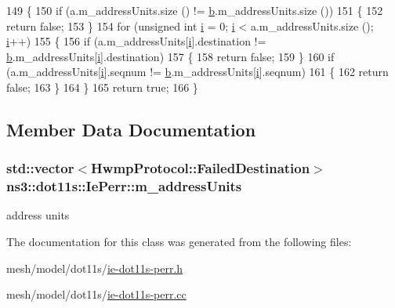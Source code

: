 \begin{DoxyCode}
149 \{
150   \textcolor{keywordflow}{if} (a.m\_addressUnits.size () != \hyperlink{buildings__pathloss_8m_a21ad0bd836b90d08f4cf640b4c298e7c}{b}.m\_addressUnits.size ())
151     \{
152       \textcolor{keywordflow}{return} \textcolor{keyword}{false};
153     \}
154   \textcolor{keywordflow}{for} (\textcolor{keywordtype}{unsigned} \textcolor{keywordtype}{int} \hyperlink{bernuolliDistribution_8m_a6f6ccfcf58b31cb6412107d9d5281426}{i} = 0; \hyperlink{bernuolliDistribution_8m_a6f6ccfcf58b31cb6412107d9d5281426}{i} < a.m\_addressUnits.size (); \hyperlink{bernuolliDistribution_8m_a6f6ccfcf58b31cb6412107d9d5281426}{i}++)
155     \{
156       \textcolor{keywordflow}{if} (a.m\_addressUnits[\hyperlink{bernuolliDistribution_8m_a6f6ccfcf58b31cb6412107d9d5281426}{i}].destination != \hyperlink{buildings__pathloss_8m_a21ad0bd836b90d08f4cf640b4c298e7c}{b}.m\_addressUnits[\hyperlink{bernuolliDistribution_8m_a6f6ccfcf58b31cb6412107d9d5281426}{i}].destination)
157         \{
158           \textcolor{keywordflow}{return} \textcolor{keyword}{false};
159         \}
160       \textcolor{keywordflow}{if} (a.m\_addressUnits[\hyperlink{bernuolliDistribution_8m_a6f6ccfcf58b31cb6412107d9d5281426}{i}].seqnum != \hyperlink{buildings__pathloss_8m_a21ad0bd836b90d08f4cf640b4c298e7c}{b}.m\_addressUnits[\hyperlink{bernuolliDistribution_8m_a6f6ccfcf58b31cb6412107d9d5281426}{i}].seqnum)
161         \{
162           \textcolor{keywordflow}{return} \textcolor{keyword}{false};
163         \}
164     \}
165   \textcolor{keywordflow}{return} \textcolor{keyword}{true};
166 \}
\end{DoxyCode}


\subsection{Member Data Documentation}
\subsubsection[{\texorpdfstring{m\+\_\+address\+Units}{m_addressUnits}}]{\setlength{\rightskip}{0pt plus 5cm}std\+::vector$<${\bf Hwmp\+Protocol\+::\+Failed\+Destination}$>$ ns3\+::dot11s\+::\+Ie\+Perr\+::m\+\_\+address\+Units\hspace{0.3cm}{\ttfamily [private]}}\hypertarget{classns3_1_1dot11s_1_1IePerr_af636b95a9bb755de97ef4daae053c409}{}\label{classns3_1_1dot11s_1_1IePerr_af636b95a9bb755de97ef4daae053c409}


address units 



The documentation for this class was generated from the following files\+:\begin{DoxyCompactItemize}
\item 
mesh/model/dot11s/\hyperlink{ie-dot11s-perr_8h}{ie-\/dot11s-\/perr.\+h}\item 
mesh/model/dot11s/\hyperlink{ie-dot11s-perr_8cc}{ie-\/dot11s-\/perr.\+cc}\end{DoxyCompactItemize}
